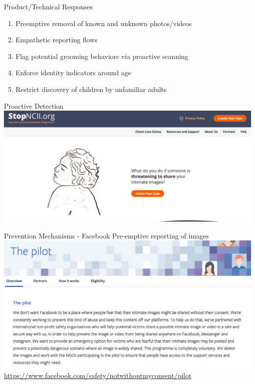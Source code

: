 \documentclass[nobackground,dvipsnames,table,aspectratio=169]{beamer}
\begin{document}
\begin{frame}{Product/Technical Responses}
    \large
    \begin{enumerate}
        \item Preemptive removal of known and unknown photos/videos
        \item Empathetic reporting flows
        \item Flag potential grooming behaviors via proactive scanning
        \item Enforce identity indicators around age
        \item Restrict discovery of children by unfamiliar adults
    \end{enumerate}
\end{frame}

\begin{frame}{Proactive Detection}
    \includegraphics[width=\textwidth]{stopncii-org}
\end{frame}

\begin{frame}{Prevention Mechanisms - Facebook}
    \centering
    Pre-emptive reporting of images
    \includegraphics[height=0.6\textheight]{facebook-pilot}
    \url{https://www.facebook.com/safety/notwithoutmyconsent/pilot}
\end{frame}
\end{document}
